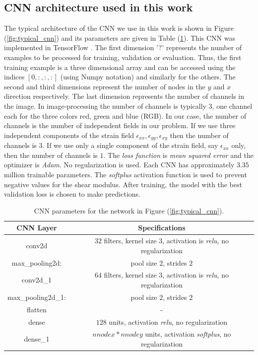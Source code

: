 \documentclass[12pt]{article}
\begin{document}
\subsection{\label{sect:cnnarch} CNN architecture used in this work}
The typical architecture of the CNN we use in this work is shown in Figure (\ref{fig:typical_cnn}) and its parameters are given in Table (\ref{tab:cnnparams}). This CNN was implemented in TensorFlow \cite{misc:tensorflow}. The first dimension '?' represents the number of examples to be processed for training, validation or evaluation. Thus, the first training example is a three dimensional array and can be accessed using the indices $[0,:,:,:]$ (using Numpy notation) and similarly for the others. The second and third dimensions represent the number of nodes in the $y$ and $x$ direction respectively. The last dimension represents the number of channels in the image. In image-processing the number of channels is typically $3$, one channel each for the three colors red, green and blue (RGB). In our case, the number of channels is the number of independent fields in our problem. If we use three independent components of the strain field $\epsilon_{xx},\epsilon_{yy},\epsilon_{xy}$ then the number of channels is $3$. If we use only a single component of the strain field, say $\epsilon_{xx}$ only, then the number of channels is $1$. The \textit{loss function} is \textit{mean squared error} and the optimizer is \textit{Adam}. No regularization is used.  Each CNN has approximately $3.35$ million trainable parameters. The \textit{softplus} activation function is used to prevent negative values for the shear modulus. After training, the model with the best validation loss is chosen to make predictions. 
\begin{table}
  \centering
 \begin{tabular}{|c|c|}
   \hline
   CNN Layer & Specifications \\
   \hline
   conv2d    & $32$ filters, kernel size $3$, activation is \textit{relu}, no regularization\\
   \hline
   max\_pooling2d: & pool size $2$, strides $2$\\
   \hline
   conv2d\_1 & $64$ filters, kernel size $3$, activation is \textit{relu}, no regularization\\
   \hline
   max\_pooling2d\_1: & pool size $2$, strides $2$\\
   \hline
   flatten & -\\
   \hline
   dense   & $128$ units, activation \textit{relu}, no regularization\\
   \hline
   dense\_1 & $nnodex*nnodey$ units, activation \textit{softplus}, no regularization\\
   \hline
 \end{tabular}
 \caption{\label{tab:cnnparams} CNN parameters for the network in Figure (\ref{fig:typical_cnn}).}
\end{table}
\end{document}
